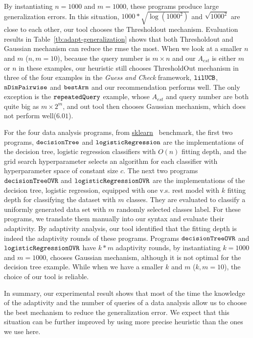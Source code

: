 
By instantiating $n = 1000$ and $m = 1000$, these programs produce large generalization errors.
In this situation, $1000* \sqrt{\log(1000^2)}$ and $\sqrt{1000^2}$ are close to each other,
our tool chooses the Thresholdout mechanism.
Evaluation results in Table~\ref{tb:adapt-generalization} shows that both Thresholdout and Gaussian mechanism can reduce the rmse the most.
When we look at a smaller $n$ and $m$ ($n,m=10$), because the query number is $m \times n$ and our $A_{est}$ is either $m$ or $n$ in these examples,
our heuristic still chooses ThresholdOut mechanism in three of the four examples in the \emph{Guess and Check} framework, $\mathtt{lilUCB}$, $\mathtt{nDimPairwise}$ and $\mathtt{bestArm}$ and our recommendation performs well. The only
exception is the $\mathtt{repeatedQuery}$ example, whose $A_{est}$ and query number are both quite big as $m \times 2^m$, and out tool
then chooses Gaussian mechanism, which does not perform well($6.01$).


For the four data analysis programs, 
from \hyperlink{https://github.com/scikit-learn/scikit-learn/tree/main/examples}{sklearn}~\cite{SklearnBenchmark} benchmark,
the first two programs, $\mathtt{decisionTree}$ and $\mathtt{logisticRegression}$ are
the
implementations of the decision tree, logistic regression classifiers
with $O(n)$ fitting depth,
and the grid search hyperparameter selects an algorithm for each classifier with 
hyperparameter space of constant size $c$.
The next two programs $\mathtt{decisionTreeOVR}$ and $\mathtt{logisticRegressionOVR}$ are
the implementations of the decision tree, logistic regression, equipped with one v.s. rest model with $k$ fitting depth for classifying the dataset with $m$ classes.
They are evaluated to classify a uniformly generated data set with $m$ randomly selected classes label. For these programs, we translate them manually into our syntax and evaluate their adaptivity.
By adaptivity analysis, our tool identified that the fitting depth is indeed the adaptivity rounds of these programs.
Programs $\mathtt{decisionTreeOVR}$ and $\mathtt{logisticRegressionOVR}$ 
have $k*m$ adaptivity rounds, by instantiating $k = 1000$ and $m = 1000$, {\THESYSTEM} chooses Gaussian mechanism, although it is not optimal for the decision tree example. While when we have a smaller $k$ and $m$ ($k,m=10$), the choice of our tool is reliable.


In summary, our experimental result shows that most of the time the knowledge of the adaptivity and the number of queries of a data analysis allow us to choose the best mechanism to  reduce the generalization error. We expect that this situation can be further improved by using more precise heuristic than the ones we use here. 



